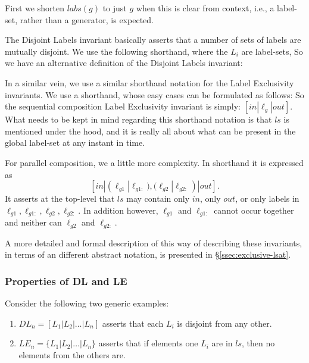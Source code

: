 First we shorten $labs(g)$ to just $g$ when this is clear from context,
i.e., a label-set, rather than a generator, is expected.

The Disjoint Labels invariant basically asserts
that a number of sets of labels are mutually disjoint.
We use the following shorthand, where the $L_i$ are label-sets,
So we have an alternative definition of the Disjoint Labels invariant:

In a similar vein, we use a similar shorthand notation
for the Label Exclusivity invariants.
We use a shorthand,
whose easy cases can be formulated as follows:
So the sequential composition Label Exclusivity invariant
is simply: $[in|\ell_g|out]$.
What needs to be kept in mind regarding this shorthand notation
is that $ls$ is mentioned under the hood,
and it is really all about what can be present in the global label-set
at any instant in time.

For parallel composition, we a little more complexity.
In shorthand it is expressed as
\[
   [in|(\ell_{g1}|\ell_{g1:}),(\ell_{g2}|\ell_{g2:})|out].
\]
It asserts at the top-level that $ls$
may contain only $in$, only $out$,
or only labels in $\ell_{g1},\ell_{g1:},\ell_{g2},\ell_{g2:}$.
In addition however, $\ell_{g1}$ and $\ell_{g1:}$ cannot occur together
and neither can $\ell_{g2}$ and $\ell_{g2:}$.

A more detailed and formal description of this way of describing
these invariants, in terms of an different abstract notation,
is presented in \S\ref{ssec:exclusive-lsat}.

\subsubsection{Properties of DL and LE}

Consider the following two generic examples:
\begin{enumerate}
  \item
    $DL_n = [L_1|L_2|\dots|L_n]$
    asserts that each $L_i$ is disjoint from any other.
  \item
    $LE_n = \{L_1|L_2|\dots|L_n\}$
    asserts that if elements one $L_i$ are in $ls$,
    then no elements from the others are.
\end{enumerate}

